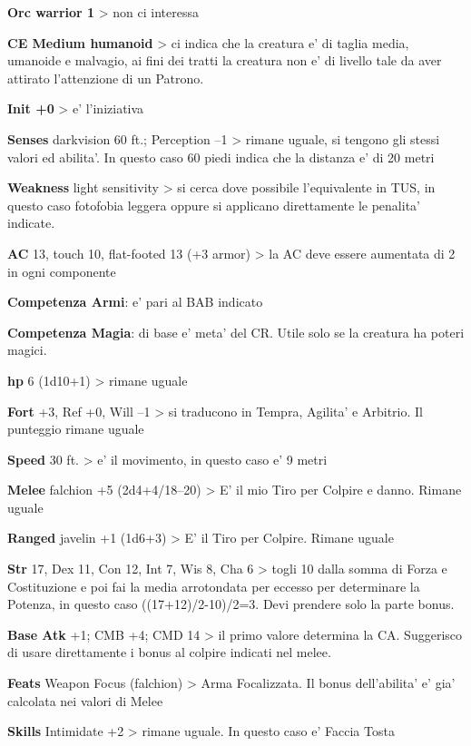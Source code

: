\documentclass[a4paper,11pt,twoside,openany]{dndbook}
\begin{document}
\textbf{Orc warrior 1} \textgreater{} non ci interessa

\textbf{CE Medium humanoid} \textgreater{} ci indica che la creatura e' di taglia media, umanoide e malvagio, ai fini dei tratti la creatura non e' di livello tale da aver attirato l'attenzione di un Patrono.

\textbf{Init +0} \textgreater{} e' l'iniziativa

\textbf{Senses} darkvision 60 ft.; Perception --1 \textgreater{} rimane uguale, si tengono gli stessi valori ed abilita'. In questo caso 60 piedi indica che la distanza e' di 20 metri

\textbf{Weakness} light sensitivity \textgreater{} si cerca dove possibile l'equivalente in TUS, in questo caso fotofobia leggera oppure si applicano direttamente le penalita' indicate.

\textbf{AC} 13, touch 10, flat-footed 13 (+3 armor) \textgreater{} la AC deve essere aumentata di 2 in ogni componente

\textbf{Competenza Armi}: e' pari al BAB indicato

\textbf{Competenza Magia}: di base e' meta' del CR. Utile solo se la creatura ha poteri magici.

\textbf{hp} 6 (1d10+1) \textgreater{} rimane uguale

\textbf{Fort} +3, Ref +0, Will --1 \textgreater{} si traducono in Tempra, Agilita' e Arbitrio. Il punteggio rimane uguale

\textbf{Speed} 30 ft. \textgreater{} e' il movimento, in questo
caso e' 9 metri

\textbf{Melee} falchion +5 (2d4+4/18--20) \textgreater{} E' il mio Tiro per Colpire e danno. Rimane uguale

\textbf{Ranged} javelin +1 (1d6+3) \textgreater{} E' il Tiro per Colpire. Rimane uguale

\textbf{Str} 17, Dex 11, Con 12, Int 7, Wis 8, Cha 6 \textgreater{} togli 10 dalla somma di Forza e Costituzione e poi fai la media arrotondata per eccesso per determinare la Potenza, in questo caso ((17+12)/2-10)/2=3. Devi prendere solo la parte bonus.

\textbf{Base Atk} +1; CMB +4; CMD 14 \textgreater{} il primo valore determina la CA. Suggerisco di usare direttamente i bonus al colpire indicati nel melee. 

\textbf{Feats} Weapon Focus (falchion) \textgreater{} Arma Focalizzata. Il bonus dell'abilita' e' gia' calcolata nei valori di Melee

\textbf{Skills} Intimidate +2 \textgreater{} rimane uguale. In questo caso e' Faccia Tosta
\end{document}
